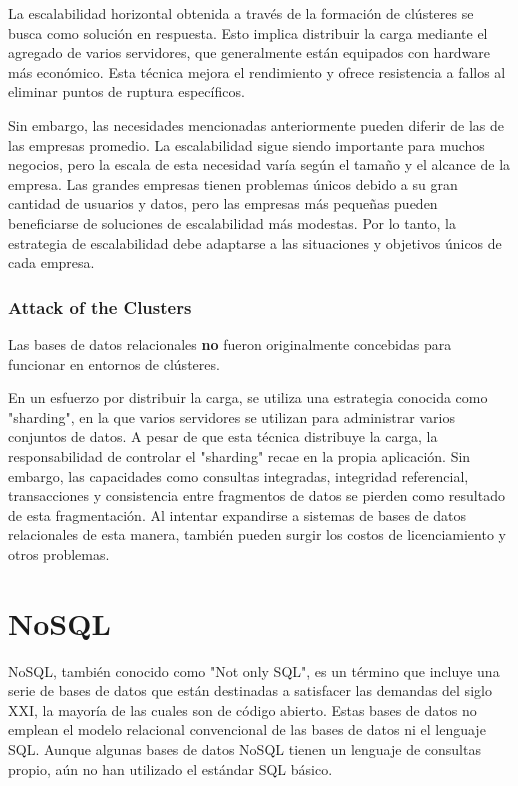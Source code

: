 \documentclass{article}
\begin{document}
		La escalabilidad horizontal obtenida a través de la formación de clústeres se busca como solución en respuesta. Esto implica distribuir la carga mediante el agregado de varios servidores, que generalmente están equipados con hardware más económico. Esta técnica mejora el rendimiento y ofrece resistencia a fallos al eliminar puntos de ruptura específicos.
		
		Sin embargo, las necesidades mencionadas anteriormente pueden diferir de las de las empresas promedio. La escalabilidad sigue siendo importante para muchos negocios, pero la escala de esta necesidad varía según el tamaño y el alcance de la empresa. Las grandes empresas tienen problemas únicos debido a su gran cantidad de usuarios y datos, pero las empresas más pequeñas pueden beneficiarse de soluciones de escalabilidad más modestas. Por lo tanto, la estrategia de escalabilidad debe adaptarse a las situaciones y objetivos únicos de cada empresa.
		
		
		\subsubsection{Attack of the Clusters}
		Las bases de datos relacionales \textbf{no} fueron originalmente concebidas para funcionar en entornos de clústeres.
		
		En un esfuerzo por distribuir la carga, se utiliza una estrategia conocida como "sharding", en la que varios servidores se utilizan para administrar varios conjuntos de datos. A pesar de que esta técnica distribuye la carga, la responsabilidad de controlar el "sharding" recae en la propia aplicación. Sin embargo, las capacidades como consultas integradas, integridad referencial, transacciones y consistencia entre fragmentos de datos se pierden como resultado de esta fragmentación. Al intentar expandirse a sistemas de bases de datos relacionales de esta manera, también pueden surgir los costos de licenciamiento y otros problemas.								
		
		\section{NoSQL}
		NoSQL, también conocido como "Not only SQL", es un término que incluye una serie de bases de datos que están destinadas a satisfacer las demandas del siglo XXI, la mayoría de las cuales son de código abierto. Estas bases de datos no emplean el modelo relacional convencional de las bases de datos ni el lenguaje SQL. Aunque algunas bases de datos NoSQL tienen un lenguaje de consultas propio, aún no han utilizado el estándar SQL básico.
		
\end{document}
